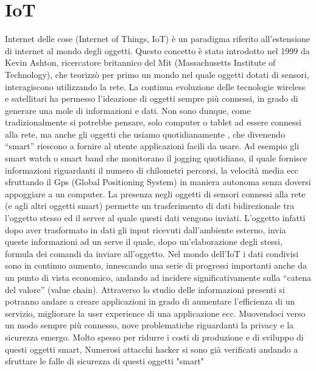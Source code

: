 \chapter{IoT}
Internet delle cose (Internet of Things, IoT) è un paradigma riferito
all’estensione di internet al mondo degli oggetti. Questo concetto è stato
introdotto nel 1999 da Kevin Ashton, ricercatore britannico del Mit
(Massachusetts Institute of Technology), che teorizzò per primo un mondo nel
quale oggetti dotati di sensori, interagiscono utilizzando la rete.  La continua
evoluzione delle tecnologie wireless e satellitari ha permesso l'ideazione di
oggetti sempre più connessi, in grado di generare una mole di informazioni e
dati.  Non sono dunque, come tradizionalmente si potrebbe pensare, solo computer
o tablet ad essere connessi alla rete, ma anche gli oggetti che usiamo
quotidianamente , che divenendo “smart” riescono a fornire al utente
applicazioni facili da usare.  Ad esempio gli smart watch o smart band che
monitorano il jogging quotidiano, il quale  fornisce informazioni riguardanti il
numero di chilometri percorsi, la velocità media ecc sfruttando il Gps (Global
Positioning System) in maniera autonoma senza doversi appoggiare a un computer.
La presenza negli oggetti di sensori connessi alla rete (e agli altri oggetti
smart) permette un trasferimento di dati bidirezionale tra l'oggetto stesso ed
il server al quale questi dati vengono inviati.  L'oggetto infatti dopo aver
trasformato in dati gli input ricevuti dall'ambiente esterno, invia queste
informazioni ad un serve il quale, dopo un'elaborazione degli stessi, formula
dei comandi da inviare all'oggetto.  Nel mondo dell’IoT i dati condivisi sono in
continuo aumento, innescando una serie di progressi importanti anche da un punto
di vista economico, andando ad incidere  significativamente sulla “catena del
valore” (value chain). Attraverso lo studio delle informazioni presenti si
potranno andare a creare applicazioni in grado di aumentare l’efficienza di un
servizio, migliorare la user experience di una applicazione ecc.  Muovendoci
verso un modo sempre più connesso, nove problematiche riguardanti la privacy e
la sicurezza emergo.  Molto spesso per ridurre i costi di produzione e di
sviluppo di questi oggetti smart, Numerosi attacchi hacker si sono già verificati andando a
sfruttare le falle di sicurezza di questi oggetti "smart" 
